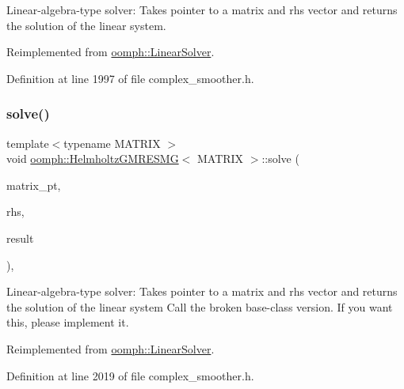 Linear-\/algebra-\/type solver\+: Takes pointer to a matrix and rhs vector and returns the solution of the linear system. 



Reimplemented from \hyperlink{classoomph_1_1LinearSolver_a546c09822d18191df14caed864c04c09}{oomph\+::\+Linear\+Solver}.



Definition at line 1997 of file complex\+\_\+smoother.\+h.

\mbox{\label{classoomph_1_1HelmholtzGMRESMG_a14ba0370fbc782fa7ab9364a035a7513}} 
\subsubsection{\texorpdfstring{solve()}{solve()}\hspace{0.1cm}{\footnotesize\ttfamily [3/3]}}
{\footnotesize\ttfamily template$<$typename M\+A\+T\+R\+IX $>$ \\
void \hyperlink{classoomph_1_1HelmholtzGMRESMG}{oomph\+::\+Helmholtz\+G\+M\+R\+E\+S\+MG}$<$ M\+A\+T\+R\+IX $>$\+::solve (\begin{DoxyParamCaption}\item[{\hyperlink{classoomph_1_1DoubleMatrixBase}{Double\+Matrix\+Base} $\ast$const \&}]{matrix\+\_\+pt,  }\item[{const \hyperlink{classoomph_1_1Vector}{Vector}$<$ double $>$ \&}]{rhs,  }\item[{\hyperlink{classoomph_1_1Vector}{Vector}$<$ double $>$ \&}]{result }\end{DoxyParamCaption})\hspace{0.3cm}{\ttfamily [inline]}, {\ttfamily [virtual]}}



Linear-\/algebra-\/type solver\+: Takes pointer to a matrix and rhs vector and returns the solution of the linear system Call the broken base-\/class version. If you want this, please implement it. 



Reimplemented from \hyperlink{classoomph_1_1LinearSolver_a1f7a2ee2cd18d3dafc20a61ca2f52dbb}{oomph\+::\+Linear\+Solver}.



Definition at line 2019 of file complex\+\_\+smoother.\+h.




